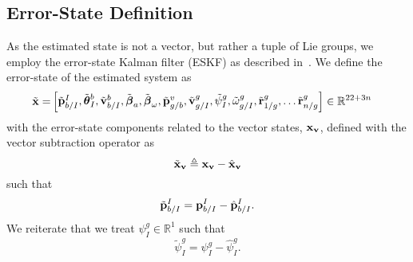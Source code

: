 

\subsection{Error-State Definition}

As the estimated state is not a vector, but rather a tuple of Lie groups, we
employ the error-state Kalman filter (ESKF) as described in~\cite{koch2017relative}.
We define the error-state of the estimated system as
\begin{align}
  \tilde{\boldsymbol{\mathrm{x}}} =&
  \left[ \begin{matrix}
    \tilde{\boldsymbol{\mathrm{p}}}_{b/I}^{I}, \tilde{\boldsymbol{\mathrm{\theta}}}_I^{b}, \tilde{\boldsymbol{\mathrm{v}}}_{b/I}^b,
    \tilde{\boldsymbol{\mathrm{\beta}}}_a,
    \tilde{\boldsymbol{\mathrm{\beta}}}_{\omega},
    \tilde{\boldsymbol{\mathrm{p}}}_{g/b}^{v}, \tilde{\boldsymbol{\mathrm{v}}}_{g/I}^{g}, \tilde{\psi}_{I}^{g},
    \tilde{\omega}_{g/I}^{g},
      \tilde{\boldsymbol{\mathrm{r}}}_{1/g}^{g}, \dots \tilde{\boldsymbol{\mathrm{r}}}_{n/g}^{g}
  \end{matrix} \right]
  \in \mathbb{R}^{22 + 3n}
\end{align}
with the error-state components related to the vector states, $\boldsymbol{\mathrm{x}}_{\boldsymbol{\mathrm{v}}}$, defined with
the vector subtraction operator as
\begin{equation}
\tilde{\boldsymbol{\mathrm{x}}}_{\boldsymbol{\mathrm{v}}} \triangleq \boldsymbol{\mathrm{x}}_{\boldsymbol{\mathrm{v}}} - \hat{\boldsymbol{\mathrm{x}}}_{\boldsymbol{\mathrm{v}}}
\label{eq:est_paper_vector_error_state}
\end{equation}
such that
\begin{equation}
  \tilde{\boldsymbol{\mathrm{p}}}_{b/I}^I = \boldsymbol{\mathrm{p}}_{b/I}^I - \hat{\boldsymbol{\mathrm{p}}}_{b/I}^I.
  \label{eq:est_paper_uav_pos_err_state}
\end{equation}
We reiterate that we treat $\psi_I^g \in \mathbb{R}^1$
such that
\begin{equation}
  \tilde{\psi}_I^g = \psi_I^g - \hat{\psi}_I^g.
  \label{eq:2d_att_err_state}
\end{equation}

